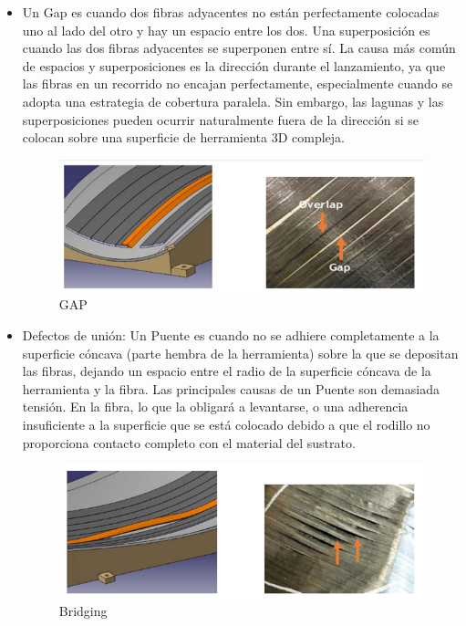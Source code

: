 \begin{itemize}
    \item Un Gap es cuando dos fibras adyacentes no están perfectamente colocadas uno al lado del otro y hay un espacio entre los dos. Una superposición es cuando las dos fibras adyacentes se superponen entre sí. La causa más común de espacios y superposiciones es la dirección durante el lanzamiento, ya que las fibras en un recorrido no encajan perfectamente, especialmente cuando se adopta una estrategia de cobertura paralela. Sin embargo, las lagunas y las superposiciones pueden ocurrir naturalmente fuera de la dirección si se colocan sobre una superficie de herramienta 3D compleja.

\begin{figure}[h]
    \centering
    \includegraphics[width=0.9\linewidth]{eins.png}
    \caption{GAP}
    \label{fig:enter-label}
\end{figure}


\item Defectos de unión: Un Puente es cuando no se adhiere completamente a la superficie cóncava (parte hembra de la herramienta) sobre la que se depositan las fibras, dejando un espacio entre el radio de la superficie cóncava de la herramienta y la fibra. Las principales causas de un Puente son demasiada tensión. En la fibra, lo que la obligará a levantarse, o una adherencia insuficiente a la superficie que se está colocado debido a que el rodillo no proporciona contacto completo con el material del sustrato.

\begin{figure}[H]
    \centering
    \includegraphics[width=0.9\linewidth]{zwei.png}
    \caption{Bridging}
    \label{fig:enter-label}
\end{figure}



\end{itemize}
